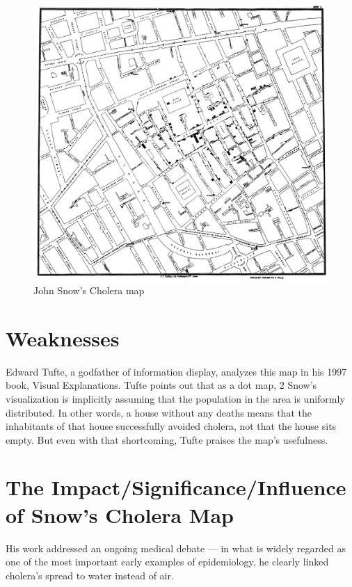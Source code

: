 \documentclass[12pt]{article}
\begin{document}
    \begin{figure}
    \centering
    \includegraphics[scale=0.1]{Snow-cholera-map-1}
    \caption{John Snow's Cholera map}
    \label{fig:snow}
    \end{figure}



\section{Weaknesses}

Edward Tufte, a godfather of information display, analyzes this map in his 1997 book, Visual Explanations. Tufte points out that as a dot map, 2 Snow’s visualization is implicitly assuming that the population in the area is uniformly distributed. In other words, a house without any deaths means that the inhabitants of that house successfully avoided cholera, not that the house sits empty. But even with that shortcoming, Tufte praises the map’s usefulness. \cite{blog}

\section{The Impact/Significance/Influence of Snow's Cholera Map}

His work addressed an ongoing medical debate — in what is widely regarded as one of the most important early examples of epidemiology, he clearly linked cholera’s spread to water instead of air. \cite{blog}
\end{document}

